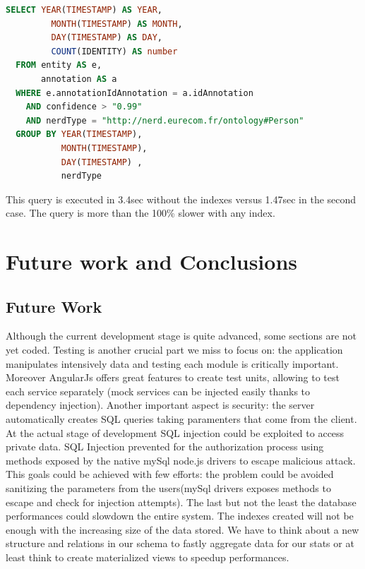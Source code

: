 \documentclass[a4paper,13pt]{report}
\begin{document}
\vspace{0.9cm}
        \begin{lstlisting}[language=SQL]
  SELECT YEAR(TIMESTAMP) AS YEAR,
         MONTH(TIMESTAMP) AS MONTH,
         DAY(TIMESTAMP) AS DAY,
         COUNT(IDENTITY) AS number
  FROM entity AS e,
       annotation AS a
  WHERE e.annotationIdAnnotation = a.idAnnotation
    AND confidence > "0.99"
    AND nerdType = "http://nerd.eurecom.fr/ontology#Person"
  GROUP BY YEAR(TIMESTAMP),
           MONTH(TIMESTAMP),
           DAY(TIMESTAMP) ,
           nerdType
        \end{lstlisting}
\vspace{0.3cm}
This query is executed in 3.4sec without the indexes versus 1.47sec in the second case. The query is more than the 100\% slower with any index.

\chapter{Future work and Conclusions} %
\label{cha:future_work_and_conclusions}
\section{Future Work}
Although the current development stage is quite advanced, some sections are  not yet coded.
Testing is another crucial part we miss to focus on: the application manipulates intensively data and testing  each module is critically important. Moreover AngularJs offers great features to create  test units, allowing to test each service separately (mock services can be injected easily thanks to dependency injection).\newline
Another important aspect is security: the server automatically creates SQL queries taking paramenters that come from the client. At the actual stage of development SQL injection could be exploited to access private data. SQL Injection prevented for the authorization process using methods exposed by the native mySql node.js drivers to escape malicious attack.
This goals could be achieved with few efforts: the problem could be avoided sanitizing the parameters from the users(mySql drivers exposes methods to escape and check for injection attempts).\newline
 The last but not the least the database performances could slowdown the entire system. The indexes created  will not be enough with the increasing size of the data stored. We have to think about a new structure and relations in our schema to fastly aggregate data for our stats or at least think to create materialized views to speedup performances.\newline
\end{document}
